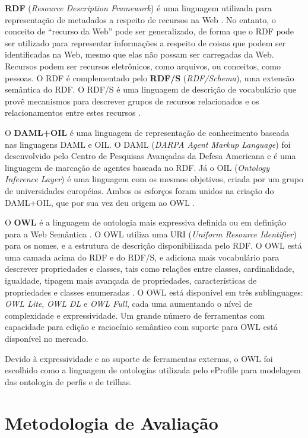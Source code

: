 \textbf{RDF} (\emph{Resource Description Framework}) é uma linguagem utilizada para representação de metadados a respeito de recursos na Web \cite{rdf}. No entanto, o conceito de ``recurso da Web'' pode ser generalizado, de forma que o RDF pode ser utilizado para representar informações a respeito de coisas que podem ser identificadas na Web, mesmo que elas não possam ser carregadas da Web. Recursos podem ser recursos eletrônicos, como arquivos, ou conceitos, como pessoas. O RDF é complementado pelo \textbf{RDF/S} (\emph{RDF/Schema}), uma extensão semântica do RDF. O RDF/S é uma linguagem de descrição de vocabulário que provê mecanismos para descrever grupos de recursos relacionados e os relacionamentos entre estes recursos \cite{rdfs}.

O \textbf{DAML+OIL} é uma linguagem de representação de conhecimento baseada nas linguagens DAML e OIL. O DAML (\emph{DARPA Agent Markup Language}) foi desenvolvido pelo Centro de Pesquisas Avançadas da Defesa Americana e é uma linguagem de marcação de agentes baseada no RDF. Já o OIL (\emph{Ontology Inference Layer}) é uma linguagem com os mesmos objetivos, criada por um grupo de universidades européias. Ambos os esforços foram unidos na criação do DAML+OIL, que por sua vez deu origem ao OWL \cite{daconta03}.

O \textbf{OWL} é a linguagem de ontologia mais expressiva definida ou em definição para a Web Semântica \cite{daconta03}. O OWL utiliza uma URI (\emph{Uniform Resource Identifier}) para os nomes, e a estrutura de descrição disponibilizada pelo RDF. O OWL está uma camada acima do RDF e do RDF/S, e adiciona mais vocabulário para descrever propriedades e classes, tais como relações entre classes, cardinalidade, igualdade, tipagem mais avançada de propriedades, características de propriedades e classes enumeradas \cite{owl-guide}. O OWL está disponível em três sublinguages: \emph{OWL Lite}, \emph{OWL DL} e \emph{OWL Full}, cada uma aumentando o nível de complexidade e expressividade. Um grande número de ferramentas com capacidade para edição e raciocínio semântico com suporte para OWL está disponível no mercado.

Devido à expressividade e ao suporte de ferramentas externas, o OWL foi escolhido como a linguagem de ontologias utilizada pelo eProfile para modelagem das ontologia de perfis e de trilhas.


\section{Metodologia de Avaliação}
\label{sec:avaliacao}

